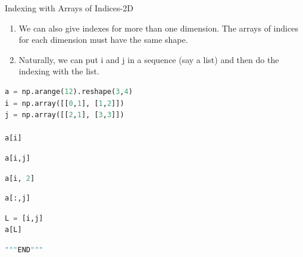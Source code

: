\documentclass[ignorenonframetext,11pt,xcolor=dvipsnames,hyperref={colorlinks,allcolors=.,urlcolor=blue, citecolor=violet, bookmarksdepth=4},aspectratio=1610]{beamer}
\providecommand{\tightlist}{%
  \setlength{\itemsep}{0pt}\setlength{\parskip}{0pt}}
\begin{document}
\begin{frame}[fragile]{Indexing with Arrays of Indices-2D}
\protect\hypertarget{indexing-with-arrays-of-indices-2d}{}

\begin{enumerate}
\tightlist
\item
  We can also give indexes for more than one dimension. The arrays of
  indices for each dimension must have the same shape.
\item
  Naturally, we can put i and j in a sequence (say a list) and then do
  the indexing with the list.
\end{enumerate}

\begin{lstlisting}[language=Python]
a = np.arange(12).reshape(3,4)
i = np.array([[0,1], [1,2]])
j = np.array([[2,1], [3,3]])

a[i]
\end{lstlisting}

\begin{lstlisting}[language=Python]
a[i,j]
\end{lstlisting}

\begin{lstlisting}[language=Python]
a[i, 2]
\end{lstlisting}

\begin{lstlisting}[language=Python]
a[:,j]
\end{lstlisting}

\begin{lstlisting}[language=Python]
L = [i,j]
a[L]
\end{lstlisting}

\begin{lstlisting}[language=Python]
"""END"""
\end{lstlisting}

\end{frame}
\end{document}
